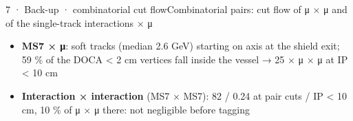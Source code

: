 \begin{btframe}{7 · Back-up · combinatorial cut flow}{Combinatorial pairs: cut flow of μ × μ and of the single-track interactions × μ}
{\begin{itemize}
  \item \textbf{MS7 × μ}: soft tracks (median 2.6 GeV) starting on axis at the shield exit; 59 \% of the DOCA < 2 cm vertices fall inside the vessel → 25 × μ × μ at IP < 10 cm
  \item \textbf{Interaction × interaction} (MS7 × MS7): 82 / 0.24 at pair cuts / IP < 10 cm, 10 \% of μ × μ there: not negligible before tagging
\end{itemize}}
\end{btframe}

